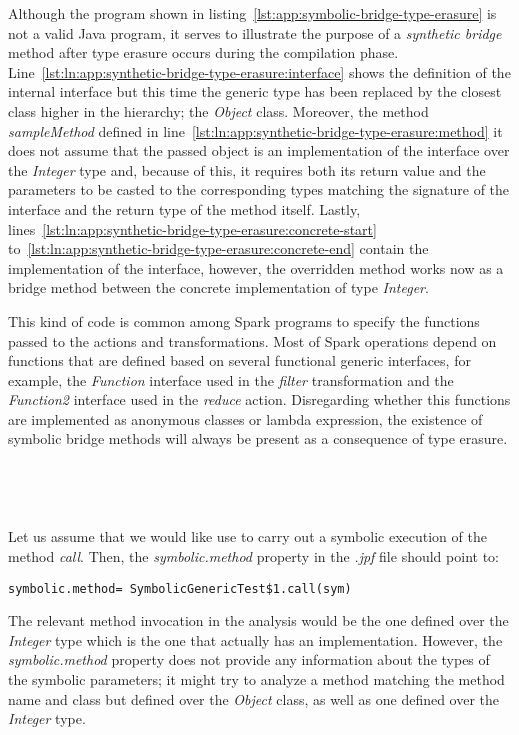 Although the program shown in listing~\ref{lst:app:symbolic-bridge-type-erasure} is not a valid Java program, it serves to illustrate the purpose of a \textit{synthetic bridge} method after type erasure occurs during the compilation phase. Line~\ref{lst:ln:app:synthetic-bridge-type-erasure:interface} shows the definition of the internal interface but this time the generic type has been replaced by the closest class higher in the hierarchy; the \textit{Object} class. Moreover, the method \textit{sampleMethod} defined in line~\ref{lst:ln:app:synthetic-bridge-type-erasure:method} it does not assume that the passed object is an implementation of the interface over the \textit{Integer} type and, because of this, it requires both its return value and the parameters to be casted to the corresponding types matching the signature of the interface and the return type of the method itself. Lastly, lines~\ref{lst:ln:app:synthetic-bridge-type-erasure:concrete-start} to~\ref{lst:ln:app:synthetic-bridge-type-erasure:concrete-end} contain the implementation of the interface, however, the overridden method works now as a bridge method between the concrete implementation of type \textit{Integer}. 

This kind of code is common among Spark programs to specify the functions passed to the actions and transformations. Most of Spark operations depend on functions that are defined based on several functional generic interfaces, for example, the \textit{Function} interface used in the \textit{filter} transformation and the \textit{Function2} interface used in the \textit{reduce} action. Disregarding whether this functions are implemented as anonymous classes or lambda expression, the existence of symbolic bridge methods will always be present as a consequence of type erasure.
\\ \\ \\ \\ \\
Let us assume that we would like use \spf{} to carry out a symbolic execution of the method \textit{call}. Then, the \textit{symbolic.method} property in the \textit{.jpf} file should point to:

\hspace*{1cm} \texttt{symbolic.method= SymbolicGenericTest\$1.call(sym)}

The relevant method invocation in the analysis would be the one defined over the \textit{Integer} type which is the one that actually has an implementation. However, the \textit{symbolic.method} property does not provide any information about the types of the symbolic parameters; it might try to analyze a method matching the method name and class but defined over the \textit{Object} class, as well as one defined over the \textit{Integer} type.

